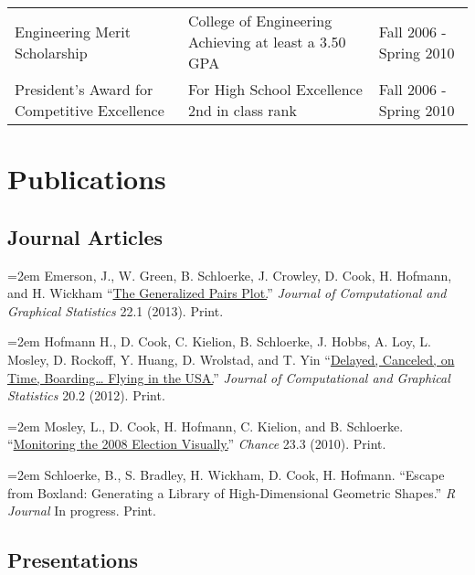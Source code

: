 \documentclass[oneside]{article}
\begin{document}
\begin{tabular}{p{7cm}p{7cm}p{1.9cm}}
Engineering Merit Scholarship&
College of Engineering \newline Achieving at least a 3.50 GPA&
Fall 2006 - \newline Spring 2010\\[0.5em]

President's Award for Competitive Excellence &
For High School Excellence \newline 2nd in class rank &
Fall 2006 - \newline Spring 2010\\[0.5em]
\end{tabular}

\newpage
\section{Publications}
    
  \subsection{Journal Articles}
    

    \hangindent=2em
    Emerson, J., W. Green, B. Schloerke, J. Crowley, D. Cook, H. Hofmann, and H. Wickham ``\href{http://vita.had.co.nz/papers/gpp.pdf}{The Generalized Pairs Plot.}'' \emph{Journal of Computational and Graphical Statistics} 22.1 (2013). Print.
    
    \hangindent=2em
    Hofmann H., D. Cook, C. Kielion, B. Schloerke, J. Hobbs, A. Loy, L. Mosley, D. Rockoff, Y. Huang, D. Wrolstad, and T. Yin ``\href{http://amstat.tandfonline.com/doi/abs/10.1198/jcgs.2011.3de}{Delayed, Canceled, on Time, Boarding… Flying in the USA.}'' \emph{Journal of Computational and Graphical Statistics} 20.2 (2012). Print.

    \hangindent=2em
    Mosley, L., D. Cook, H. Hofmann, C. Kielion, and B. Schloerke. ``\href{http://chance.amstat.org/files/2010/12/Visually.pdf}{Monitoring the 2008 Election Visually.}'' \emph{Chance} 23.3 (2010). Print.
    
    \hangindent=2em
    Schloerke, B., S. Bradley, H. Wickham, D. Cook, H. Hofmann. ``Escape from Boxland: Generating a Library of High-Dimensional Geometric Shapes.'' \emph{R Journal} In progress. Print.
    
    
  \subsection{Presentations}
  
\end{document}
